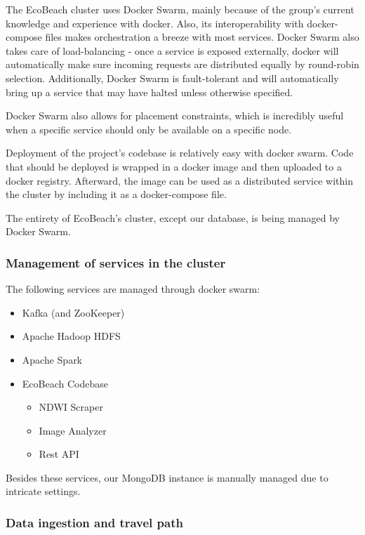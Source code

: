The EcoBeach cluster uses Docker Swarm, mainly because of the group's current knowledge and experience with docker. Also, its interoperability with docker-compose files makes orchestration a breeze with most services. Docker Swarm also takes care of load-balancing - once a service is exposed externally, docker will automatically make sure incoming requests are distributed equally by round-robin selection. Additionally, Docker Swarm is fault-tolerant and will automatically bring up a service that may have halted unless otherwise specified. 

Docker Swarm also allows for placement constraints, which is incredibly useful when a specific service should only be available on a specific node.

Deployment of the project's codebase is relatively easy with docker swarm. Code that should be deployed is wrapped in a docker image and then uploaded to a docker registry. Afterward, the image can be used as a distributed service within the cluster by including it as a docker-compose file. 

The entirety of EcoBeach's cluster, except our database, is being managed by Docker Swarm. 

\subsubsection*{Management of services in the cluster}

The following services are managed through docker swarm:

\begin{itemize}
    \item Kafka (and ZooKeeper)
    \item Apache Hadoop HDFS
    \item Apache Spark
    \item EcoBeach Codebase
    \begin{itemize}
        \item NDWI Scraper
        \item Image Analyzer
        \item Rest API
    \end{itemize}
\end{itemize}
\noindent
Besides these services, our MongoDB instance is manually managed due to intricate settings.

\subsubsection{Data ingestion and travel path}

